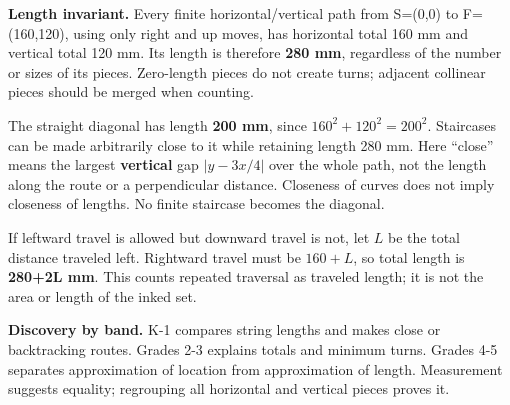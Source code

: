 \textbf{Length invariant.} Every finite horizontal/vertical path from S=(0,0) to F=(160,120), using only right and up moves, has horizontal total 160 mm and vertical total 120 mm. Its length is therefore \textbf{280 mm}, regardless of the number or sizes of its pieces. Zero-length pieces do not create turns; adjacent collinear pieces should be merged when counting.

The straight diagonal has length \textbf{200 mm}, since $160^2+120^2=200^2$. Staircases can be made arbitrarily close to it while retaining length 280 mm. Here ``close'' means the largest \textbf{vertical} gap $|y - 3x/4|$ over the whole path, not the length along the route or a perpendicular distance. Closeness of curves does not imply closeness of lengths. No finite staircase becomes the diagonal.

If leftward travel is allowed but downward travel is not, let $L$ be the total distance traveled left. Rightward travel must be $160+L$, so total length is \textbf{280+2L mm}. This counts repeated traversal as traveled length; it is not the area or length of the inked set.

\textbf{Discovery by band.} K-1 compares string lengths and makes close or backtracking routes. Grades 2-3 explains totals and minimum turns. Grades 4-5 separates approximation of location from approximation of length. Measurement suggests equality; regrouping all horizontal and vertical pieces proves it.
